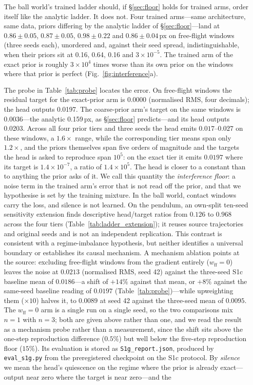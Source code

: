 \documentclass{article}
\begin{document}
The ball world's trained ladder should, if \S\ref{sec:floor} holds for trained arms, order itself like the analytic ladder. It does not. Four trained arms---same architecture, same data, priors differing by the analytic ladder of \S\ref{sec:floor}---land at $0.86 \pm 0.05$, $0.87 \pm 0.05$, $0.98 \pm 0.22$ and $0.86 \pm 0.04$\,px on free-flight windows (three seeds each), unordered and, against their seed spread, indistinguishable, when their priors sit at 0.16, 0.64, 0.16 and $3{\times}10^{-5}$. The trained arm of the exact prior is roughly $3{\times}10^{4}$ times worse than its own prior on the windows where that prior is perfect (Fig.~\ref{fig:interference}a).

The probe in Table~\ref{tab:probe} locates the error. On free-flight windows the residual target for the exact-prior arm is 0.0000 (normalised RMS, four decimals); the head outputs 0.0197. The coarse-prior arm's target on the same windows is 0.0036---the analytic 0.159\,px, as \S\ref{sec:floor} predicts---and its head outputs 0.0203. Across all four prior tiers and three seeds the head emits $0.017$--$0.027$ on these windows, a $1.6\times$ range, while the corresponding tier means span only $1.2\times$, and the priors themselves span five orders of magnitude and the targets the head is asked to reproduce span $10^{5}$: on the exact tier it emits $0.0197$ where its target is $1.4\times10^{-7}$, a ratio of $1.4\times10^{5}$. The head is closer to a constant than to anything the prior asks of it. We call this quantity the \emph{interference floor}: a noise term in the trained arm's error that is not read off the prior, and that we hypothesise is set by the training mixture. In the ball world, contact windows carry the loss, and silence is not learned. On the pendulum, an own-split ten-seed sensitivity extension finds descriptive head/target ratios from $0.126$ to $0.968$ across the four tiers (Table~\ref{tab:ladder_extension}); it reuses source trajectories and original seeds and is not an independent replication. This contrast is consistent with a regime-imbalance hypothesis, but neither identifies a universal boundary or establishes its causal mechanism. A mechanism ablation points at the source: excluding free-flight windows from the gradient entirely ($w_{\text{ff}}{=}0$) leaves the noise at $0.0213$ (normalised RMS, seed 42) against the three-seed S1c baseline mean of $0.0186$---a shift of $+14\%$ against that mean, or $+8\%$ against the same-seed baseline reading of $0.0197$ (Table~\ref{tab:probe})---while upweighting them ($\times10$) halves it, to $0.0089$ at seed 42 against the three-seed mean of $0.0095$. The $w_{\text{ff}}{=}0$ arm is a single run on a single seed, so the two comparisons mix $n{=}1$ with $n{=}3$; both are given above rather than one, and we read the result as a mechanism probe rather than a measurement, since the shift sits above the one-step reproduction difference ($0.5\%$) but well below the five-step reproduction floor ($15\%$). Its evaluation is stored as \texttt{S1g\_report.json}, produced by \texttt{eval\_s1g.py} from the preregistered checkpoint on the S1c protocol. By \emph{silence} we mean the head's quiescence on the regime where the prior is already exact---output near zero where the target is near zero---and the 
\end{document}
